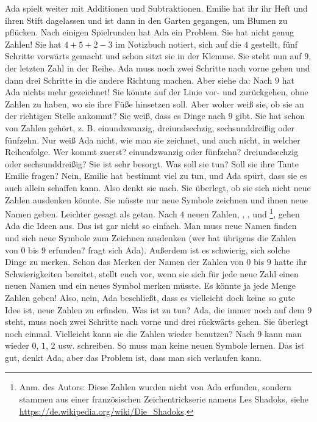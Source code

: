 Ada spielt weiter mit Additionen und Subtraktionen. 
Emilie hat ihr ihr Heft und ihren Stift dagelassen und ist dann in den Garten gegangen, um Blumen zu pflücken. 
Nach einigen Spielrunden hat Ada ein Problem. 
Sie hat nicht genug Zahlen! 
Sie hat $4 + 5 + 2 - 3$ im Notizbuch notiert, sich auf die $4$ gestellt, fünf Schritte vorwärts gemacht und schon sitzt sie in der Klemme. 
Sie steht nun auf $9$, der letzten Zahl in der Reihe. 
Ada muss noch zwei Schritte nach vorne gehen und dann drei Schritte in die andere Richtung machen.
Aber siehe da: Nach $9$ hat Ada nichts mehr gezeichnet!
Sie könnte auf der Linie vor- und zurückgehen, ohne Zahlen zu haben, wo sie ihre Füße hinsetzen soll. Aber woher weiß sie, ob sie an der richtigen Stelle ankommt? 
Sie weiß, dass es Dinge nach $9$ gibt. 
Sie hat schon von Zahlen gehört, z. B. einundzwanzig, dreiundsechzig, sechsunddreißig oder fünfzehn. 
Nur weiß Ada nicht, wie man sie zeichnet, und auch nicht, in welcher Reihenfolge.
Wer kommt zuerst? einundzwanzig oder fünfzehn? dreiundsechzig oder sechsunddreißig?
Sie ist sehr besorgt. Was soll sie tun? Soll sie ihre Tante Emilie fragen? Nein, Emilie hat bestimmt viel zu tun, und Ada spürt, dass sie es auch allein schaffen kann. Also denkt sie nach. Sie überlegt, ob sie sich nicht neue Zahlen ausdenken könnte. 
Sie müsste nur neue Symbole zeichnen und ihnen neue Namen geben. Leichter gesagt als getan. Nach $4$ neuen Zahlen, , ,  und \footnote{Anm. des Autors: Diese Zahlen wurden nicht von Ada erfunden, sondern stammen aus einer französischen Zeichentrickserie namens Les Shadoks, siehe \url{https://de.wikipedia.org/wiki/Die_Shadoks}.}, gehen Ada die Ideen aus. 
Das ist gar nicht so einfach. Man muss neue Namen finden und sich neue Symbole zum Zeichnen ausdenken (wer hat übrigens die Zahlen von $0$ bis $9$ erfunden? fragt sich Ada). Außerdem ist es schwierig, sich solche Dinge zu merken. Schon das Merken der Namen der Zahlen von $0$ bis $9$ hatte ihr Schwierigkeiten bereitet, stellt euch vor, wenn sie sich für jede neue Zahl einen neuen Namen und ein neues Symbol merken müsste.
Es könnte ja jede Menge Zahlen geben! 
Also, nein, Ada beschließt, dass es vielleicht doch keine so gute Idee ist, neue Zahlen zu erfinden. 
Was ist zu tun? Ada, die immer noch auf dem $9$ steht, muss noch zwei Schritte nach vorne und drei rückwärts gehen. Sie überlegt noch einmal. Vielleicht kann sie die Zahlen wieder benutzen? 
Nach $9$ kann man wieder $0$, $1$, $2$ usw. schreiben. So muss man keine neuen Symbole lernen. Das ist gut, denkt Ada, aber das Problem ist, dass man sich verlaufen kann. 
